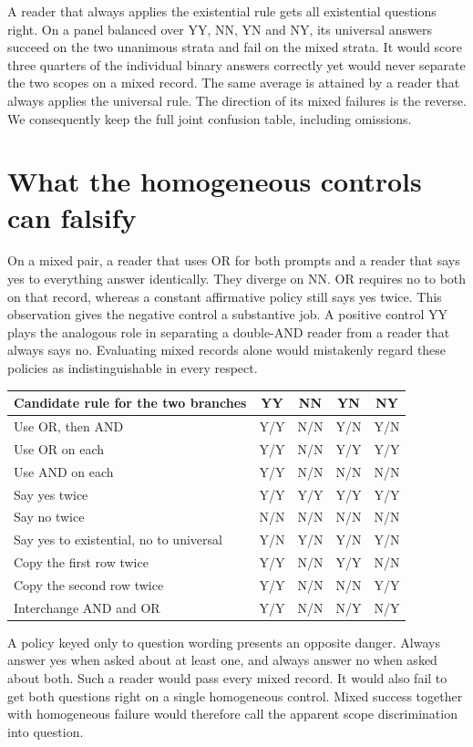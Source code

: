 \documentclass[12pt,letterpaper]{article}
\begin{document}
A reader that always applies the existential rule gets all existential questions right. On a panel balanced over YY, NN, YN and NY, its universal answers succeed on the two unanimous strata and fail on the mixed strata. It would score three quarters of the individual binary answers correctly yet would never separate the two scopes on a mixed record. The same average is attained by a reader that always applies the universal rule. The direction of its mixed failures is the reverse. We consequently keep the full joint confusion table, including omissions.

\section{What the homogeneous controls can falsify}
On a mixed pair, a reader that uses OR for both prompts and a reader that says yes to everything answer identically. They diverge on NN. OR requires no to both on that record, whereas a constant affirmative policy still says yes twice. This observation gives the negative control a substantive job. A positive control YY plays the analogous role in separating a double-AND reader from a reader that always says no. Evaluating mixed records alone would mistakenly regard these policies as indistinguishable in every respect.

\begin{center}\small\begin{tabularx}{\linewidth}{@{}Ycccc@{}}\toprule
Candidate rule for the two branches & YY & NN & YN & NY\\\midrule
Use OR, then AND & Y/Y & N/N & Y/N & Y/N\\
Use OR on each & Y/Y & N/N & Y/Y & Y/Y\\
Use AND on each & Y/Y & N/N & N/N & N/N\\
Say yes twice & Y/Y & Y/Y & Y/Y & Y/Y\\
Say no twice & N/N & N/N & N/N & N/N\\
Say yes to existential, no to universal & Y/N & Y/N & Y/N & Y/N\\
Copy the first row twice & Y/Y & N/N & Y/Y & N/N\\
Copy the second row twice & Y/Y & N/N & N/N & Y/Y\\
Interchange AND and OR & Y/Y & N/N & N/Y & N/Y\\\bottomrule
\end{tabularx}\end{center}

A policy keyed only to question wording presents an opposite danger. Always answer yes when asked about at least one, and always answer no when asked about both. Such a reader would pass every mixed record. It would also fail to get both questions right on a single homogeneous control. Mixed success together with homogeneous failure would therefore call the apparent scope discrimination into question.
\end{document}
